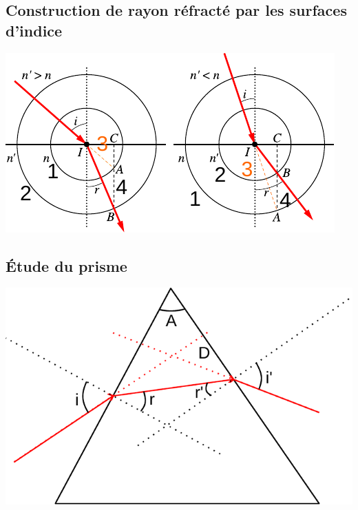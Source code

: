 \documentclass[french]{yLectureNote}
\begin{document}
	\subsection{Construction de rayon réfracté par les surfaces d'indice}
%
%
%
\includegraphics{fig1}
\subsection{Étude du prisme}
\includegraphics[scale=0.4]{prisme_1}
\end{document}
